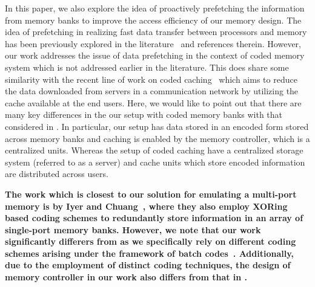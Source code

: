 In this paper, we also explore the idea of proactively prefetching the information from memory banks to improve the access efficiency of our memory design. The idea of prefetching in realizing fast data transfer between processors and memory has been previously explored in the literature~\cite{Kim2016, Kadjo2014, Shevgoor2015, JL2013} and references therein. However, our work addresses the issue of data prefetching in the context of coded memory system which is not addressed earlier in the literature. This does share some similarity with the recent line of work on coded caching~\cite{MN16a} which aims to reduce the data downloaded from servers in a communication network by utilizing the cache available at the end users. Here, we would like to point out that there are many key differences in the our setup with coded memory banks with that considered in \cite{MN16a}. In particular, our setup has data stored in an encoded form stored across memory banks and caching is enabled by the memory controller, which is a centralized units. Whereas the setup of coded caching have a centralized storage system (referred to as a server) and cache units which store encoded information are distributed across users.

{\color{red} {\bf The work which is closest to our solution for emulating a multi-port memory is by Iyer and Chuang~\cite{Memoir_xor, Memoir_xor_virtual}, where they also employ XORing based coding schemes to redundantly store information in an array of single-port memory banks. However, we note that our work significantly differers from \cite{Memoir_xor, Memoir_xor_virtual} as we specifically rely on different coding schemes arising under the framework of batch codes~\cite{batchcodes}. Additionally, due to the employment of distinct coding techniques, the design of memory controller in our work also differs from that in \cite{Memoir_xor, Memoir_xor_virtual}.}}


